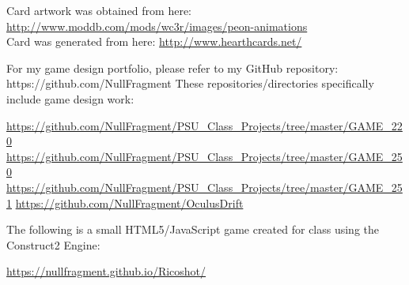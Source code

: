 \documentclass[12pt, a4paper]{awesome-cv}
\begin{document}
\begin{cvletter}
Card artwork was obtained from here:
\url{http://www.moddb.com/mods/wc3r/images/peon-animations}\\
Card was generated from here: 
\url{http://www.hearthcards.net/}


For my game design portfolio, please refer to my GitHub repository: https://github.com/NullFragment
These repositories/directories specifically include game design work:\vspace{-1em}
\begin{outline}
	\1 \url{https://github.com/NullFragment/PSU_Class_Projects/tree/master/GAME_220}\vspace{-1em}
	\1 \url{https://github.com/NullFragment/PSU_Class_Projects/tree/master/GAME_250}\vspace{-1em}
	\1 \url{https://github.com/NullFragment/PSU_Class_Projects/tree/master/GAME_251}\vspace{-1em}
	\1 \url{https://github.com/NullFragment/OculusDrift}\vspace{-1em}
\end{outline}

The following is a small HTML5/JavaScript game created for class using the Construct2 Engine:\vspace{-1em}
\begin{outline}
	\1 \url{https://nullfragment.github.io/Ricoshot/}
\end{outline}

\end{cvletter}


\end{document}
